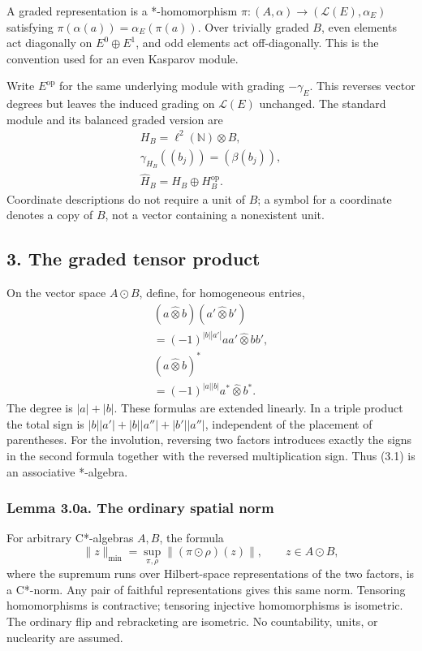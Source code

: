 \documentclass[
  11pt,
]{article}
\begin{document}
A graded representation is a *-homomorphism
\(\pi:(A,\alpha)\to(\mathcal L(E),\alpha_E)\) satisfying
\(\pi(\alpha(a))=\alpha_E(\pi(a))\). Over trivially graded \(B\), even
elements act diagonally on \(E^0\oplus E^1\), and odd elements act
off-diagonally. This is the convention used for an even Kasparov module.

Write \(E^{\mathrm{op}}\) for the same underlying module with grading
\(-\gamma_E\). This reverses vector degrees but leaves the induced
grading on \(\mathcal L(E)\) unchanged. The standard module and its
balanced graded version are \[
\begin{gathered}
H_B=\ell^2(\mathbb N)\otimes B,\\
\gamma_{H_B}((b_j))=(\beta(b_j)),\\
\widehat H_B=H_B\oplus H_B^{\mathrm{op}}.
\end{gathered}
\tag{2.5}
\] Coordinate descriptions do not require a unit of \(B\); a symbol for
a coordinate denotes a copy of \(B\), not a vector containing a
nonexistent unit.

\subsection{3. The graded tensor
product}\label{the-graded-tensor-product}

On the vector space \(A\odot B\), define, for homogeneous entries, \[
\begin{gathered}
(a\widehat\otimes b)(a'\widehat\otimes b')\\
=(-1)^{|b||a'|}aa'\widehat\otimes bb',\\
(a\widehat\otimes b)^*\\
=(-1)^{|a||b|}a^*\widehat\otimes b^*.
\end{gathered}
\tag{3.1}
\] The degree is \(|a|+|b|\). These formulas are extended linearly. In a
triple product the total sign is \(|b||a'|+|b||a''|+|b'||a''|\),
independent of the placement of parentheses. For the involution,
reversing two factors introduces exactly the signs in the second formula
together with the reversed multiplication sign. Thus (3.1) is an
associative *-algebra.

\subsubsection{Lemma 3.0a. The ordinary spatial
norm}\label{lemma-3.0a.-the-ordinary-spatial-norm}

For arbitrary C*-algebras \(A,B\), the formula \[
\|z\|_{\min}=\sup_{\pi,\rho}\|(\pi\odot\rho)(z)\|,
\qquad z\in A\odot B,
\] where the supremum runs over Hilbert-space representations of the two
factors, is a C*-norm. Any pair of faithful representations gives this
same norm. Tensoring homomorphisms is contractive; tensoring injective
homomorphisms is isometric. The ordinary flip and rebracketing are
isometric. No countability, units, or nuclearity are assumed.
\end{document}
